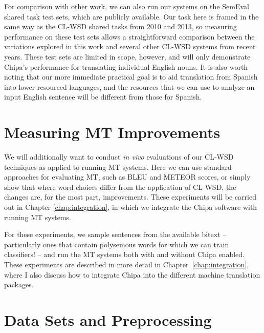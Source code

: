 For comparison with other work, we can also run our systems on the SemEval
shared task test sets, which are publicly available. Our task here is framed in
the same way as the CL-WSD shared tasks from 2010 and 2013, so measuring
performance on these test sets allows a straightforward comparison
between the variations explored in this work and several other CL-WSD systems
from recent years. These test sets are limited in scope, however, and will
only demonstrate Chipa's performance for translating individual English nouns.
It is also worth noting that our more immediate practical goal is to aid
translation from Spanish into lower-resourced languages, and the resources that
we can use to analyze an input English sentence will be different from those
for Spanish.


\section{Measuring MT Improvements}
We will additionally want to conduct \emph{in vivo} evaluations of our CL-WSD
techniques as applied to running MT systems. Here we can use standard
approaches for evaluating MT, such as BLEU and METEOR scores, or simply show
that where word choices differ from the application of CL-WSD, the changes are,
for the most part, improvements.
These experiments will be carried out in Chapter \ref{chap:integration}, in
which we integrate the Chipa software with running MT systems.

For these experiments, we sample sentences from the available bitext --
particularly ones that contain polysemous words for which we can train
classifiers! -- and run the MT systems both with and without Chipa enabled.
These experiments are described in more detail in
Chapter~\ref{chap:integration}, where I also discuss how to integrate Chipa
into the different machine translation packages.

\section{Data Sets and Preprocessing}

